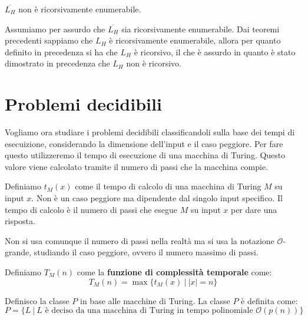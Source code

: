 \begin{teorema}
    $\overline{L_H}$ non è ricorsivamente enumerabile.
\end{teorema}
\begin{dimostrazione} 
    Assumiamo per assurdo che $\overline{L_H}$ sia ricorsivamente enumerabile.
    Dai teoremi precedenti sappiamo che $L_H$ è ricorsivamente enumerabile, allora
    per quanto definito in precedenza si ha che $L_H$ è ricorsivo, il che è assurdo
    in quanto è stato dimostrato in precedenza che $L_H$ non è ricorsivo.
\end{dimostrazione}
\section{Problemi decidibili}
Vogliamo ora studiare i problemi decidibili classificandoli sulla base dei tempi
di esecuizione, considerando la dimensione dell'input e il caso peggiore. Per fare
questo utilizzeremo il tempo di esecuzione di una macchina di Turing. Questo valore
viene calcolato tramite il numero di passi che la macchina compie.
\begin{definizione}
    Definiamo $t_M(x)$ come il tempo di calcolo di una macchina di Turing $M$ su
    input $x$. Non è un caso peggiore ma dipendente dal singolo input specifico.
    Il tempo di calcolo è il numero di passi che esegue $M$ su input $x$ per dare una risposta.
\end{definizione}
Non si usa comunque il numero di passi nella realtà ma si usa la notazione
$\mathcal{O}$-grande, studiando il caso peggiore, ovvero il numero massimo di passi.
\begin{definizione}
    Definiamo $T_M(n)$ come la \textbf{funzione di complessità temporale} come:
    \begin{equation}
        T_M(n) = \max \{t_M(x) \ | \ |x| = n\}
    \end{equation}
\end{definizione}
\begin{definizione}
    Definisco la classe $P$ in base alle macchine di Turing. La classe $P$ è definita come:
    \begin{equation}
        P = \{L \ | \ L \text{ è deciso da una macchina di Turing in tempo polinomiale } \mathcal{O}(p(n))\}
    \end{equation}
\end{definizione}
